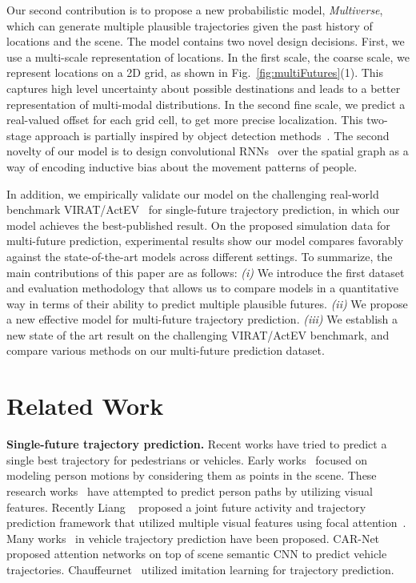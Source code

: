 \documentclass[10pt,twocolumn,letterpaper]{article}
\newcommand{\fancyname}{Multiverse}\newcommand{\Tpred}{T_{\text{pred}}}
\begin{document}
Our second contribution is to propose a new probabilistic model, \textit{\fancyname}, which can generate multiple plausible trajectories given the past history of locations and the scene.
The model contains two novel design decisions. First, we use a multi-scale representation of locations. 
In the first scale, the coarse scale, we represent locations on a 2D grid, as shown in Fig.~\ref{fig:multiFutures}(1). This captures high level uncertainty about possible destinations and leads to a better representation of multi-modal distributions. In the second fine scale, we predict a real-valued offset for each grid cell, to get more precise localization. This two-stage approach is partially inspired by object detection methods~\cite{ren2015faster}. 
The second novelty of our model is to design convolutional RNNs~\cite{xingjian2015convolutional} over the spatial graph as a way of encoding inductive bias about the movement patterns of people.


In addition, we empirically validate our model on the challenging real-world benchmark VIRAT/ActEV~\cite{oh2011large,2018trecvidawad} for single-future trajectory prediction, in which our model achieves the best-published result. On the proposed simulation data for multi-future prediction, experimental results show our model compares favorably against the state-of-the-art models across different settings. To summarize, the main contributions of this paper are as follows:
\textit{(i)} We introduce the first dataset and evaluation methodology that allows us to compare models in a quantitative way in terms of their ability to predict multiple plausible futures.
\textit{(ii)} We propose a new effective model for multi-future trajectory prediction.
\textit{(iii)} We establish a new
state of the art result
on the challenging VIRAT/ActEV benchmark,
and compare
various methods
on our multi-future prediction dataset. 
%
 \vspace{-4mm}

\section{Related Work}
\vspace{-1mm}


\noindent\textbf{Single-future trajectory prediction.}
Recent works have tried to predict a single best trajectory for pedestrians or vehicles.
Early works~\cite{manh2018scene, xue2018ss,zhang2019sr} focused on modeling person motions by considering them as points in the scene.
These research works~\cite{kooij2014context,yagi2018future,ma2017forecasting,liang2019peeking} have attempted to predict person paths by utilizing visual features. 
Recently Liang \etal ~\cite{liang2019peeking} proposed a joint future activity and trajectory prediction framework that utilized multiple visual features using focal attention~\cite{liang2018focal,liang2019focal}.
Many works~\cite{lee2017desire,sadeghian2018car,bansal2018chauffeurnet,hong2019rules,zhao2019multi} in vehicle trajectory prediction have been proposed.
CAR-Net~\cite{sadeghian2018car} proposed attention networks on top of scene semantic CNN to predict vehicle trajectories.
Chauffeurnet~\cite{bansal2018chauffeurnet} utilized imitation learning for trajectory prediction.
\end{document}
